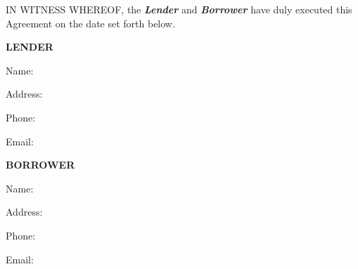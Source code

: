 
IN WITNESS WHEREOF, the \textbf{\textit{Lender}} and \textbf{\textit{Borrower}} have duly executed this Agreement on the date set forth below.


\vspace{0.5in}

\hspace{3in}
\textbf{LENDER}

\vspace{0.2in}
\hspace{3in}
Name: \LenderName{}

\vspace{0.2in}

\hspace{3in}
\parbox{3.5in}{
Address: \LenderAddress{}
}
\vspace{0.2in}

\hspace{3in}
Phone: \LenderPhone{}

\vspace{0.2in}

\hspace{3in}
Email: \LenderEmail{}


\vspace{0.5in}

\hspace{3in}
\textbf{BORROWER}

\vspace{0.2in}
\hspace{3in}
Name: \BorrowerName{}

\vspace{0.2in}

\hspace{3in}
\parbox{3.5in}{
Address: \BorrowerAddress{}
}
\vspace{0.2in}

\hspace{3in}
Phone: \BorrowerPhone{}

\vspace{0.2in}

\hspace{3in}
Email: \BorrowerEmail{}

